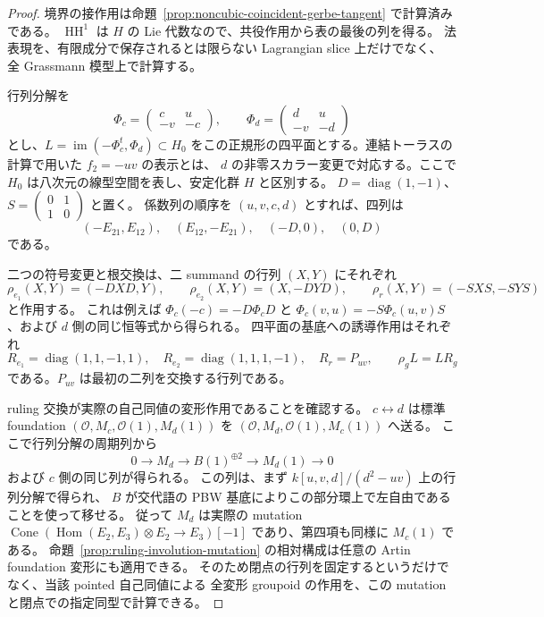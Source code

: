 \begin{proof}
境界の接作用は命題~\ref{prop:noncubic-coincident-gerbe-tangent} で計算済みである。
$\operatorname{HH}^1$ は $H$ の Lie 代数なので、共役作用から表の最後の列を得る。
法表現を、有限成分で保存されるとは限らない Lagrangian slice 上だけでなく、
全 Grassmann 模型上で計算する。

行列分解を
\[
 \Phi_c=\begin{pmatrix}c&u\\-v&-c\end{pmatrix},\qquad
 \Phi_d=\begin{pmatrix}d&u\\-v&-d\end{pmatrix}
\]
とし、$L=\operatorname{im}(-\Phi_c^t,\Phi_d)\subset H_0$
をこの正規形の四平面とする。連結トーラスの計算で用いた $f_2=-uv$ の表示とは、
$d$ の非零スカラー変更で対応する。ここで $H_0$ は八次元の線型空間を表し、安定化群 $H$ と区別する。
$D=\operatorname{diag}(1,-1)$、$S=\left(\begin{smallmatrix}0&1\\1&0\end{smallmatrix}\right)$ と置く。
係数列の順序を $(u,v,c,d)$ とすれば、四列は
\[
 (-E_{21},E_{12}),\quad(E_{12},-E_{21}),\quad(-D,0),\quad(0,D)
\]
である。

二つの符号変更と根交換は、二 summand の行列 $(X,Y)$ にそれぞれ
\[
 \rho_{e_1}(X,Y)=(-DXD,Y),\qquad
 \rho_{e_2}(X,Y)=(X,-DYD),\qquad
 \rho_r(X,Y)=(-SXS,-SYS)
\]
と作用する。
これは例えば $\Phi_c(-c)=-D\Phi_cD$ と
$\Phi_c(v,u)=-S\Phi_c(u,v)S$、および $d$ 側の同じ恒等式から得られる。
四平面の基底への誘導作用はそれぞれ
\[
 R_{e_1}=\operatorname{diag}(1,1,-1,1),\quad
 R_{e_2}=\operatorname{diag}(1,1,1,-1),\quad
 R_r=P_{uv},
 \qquad\rho_gL=LR_g
\]
である。$P_{uv}$ は最初の二列を交換する行列である。

ruling 交換が実際の自己同値の変形作用であることを確認する。
$c\leftrightarrow d$ は標準 foundation
$(\mathcal O,M_c,\mathcal O(1),M_d(1))$ を
$(\mathcal O,M_d,\mathcal O(1),M_c(1))$ へ送る。
ここで行列分解の周期列から
\[
 0\longrightarrow M_d\longrightarrow B(1)^{\oplus2}
   \longrightarrow M_d(1)\longrightarrow0
\]
および $c$ 側の同じ列が得られる。
この列は、まず $k[u,v,d]/(d^2-uv)$ 上の行列分解で得られ、
$B$ が交代語の PBW 基底によりこの部分環上で左自由であることを使って移せる。
従って $M_d$ は実際の mutation
$\operatorname{Cone}(\operatorname{Hom}(E_2,E_3)\otimes E_2\to E_3)[-1]$
であり、第四項も同様に $M_c(1)$ である。
命題~\ref{prop:ruling-involution-mutation} の相対構成は任意の Artin foundation 変形にも適用できる。
そのため閉点の行列を固定するというだけでなく、当該 pointed 自己同値による
全変形 groupoid の作用を、この mutation と閉点での指定同型で計算できる。


\end{proof}
